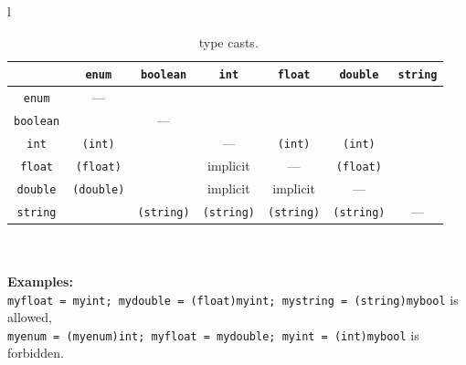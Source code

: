 \begin{table}[htbp]
  \centering
  \begin{tabular}[c]{l}  
  \begin{tabular}[c]{|c|cccccc|} \hline
    \backslashbox{to}{from} & \texttt{enum} & \texttt{boolean} & \texttt{int} & \texttt{float} & \texttt{double} & \texttt{string}\\ \hline
    \texttt{enum} & --- & & & & & \\ 
    \texttt{boolean} & & --- & & & & \\
    \texttt{int} & \texttt{(int)} & & --- & \texttt{(int)} & \texttt{(int)} & \\
    \texttt{float} & \texttt{(float)} & & implicit & --- & \texttt{(float)} & \\
    \texttt{double} &  \texttt{(double)} & & implicit & implicit & --- & \\
    \texttt{string} &  & \texttt{(string)} & \texttt{(string)} & \texttt{(string)} & \texttt{(string)} & --- \\ \hline
  \end{tabular}\\
  \\
  \small \textbf{Examples:} \\
  \small \texttt{myfloat = myint; mydouble = (float)myint; mystring = (string)mybool} is allowed, \\
  \small \texttt{myenum = (myenum)int; myfloat = mydouble; myint = (int)mybool} is forbidden.
  \end{tabular}
  \caption{\GrG\ type casts.}
  \label{tabcasts}
\end{table}

